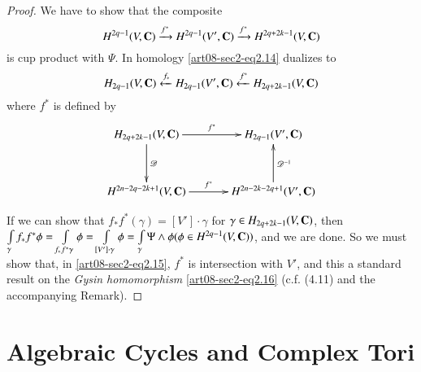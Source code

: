 \begin{proof}
We have to show that the composite
\begin{equation}
H^{2q-1}(V,\mathbf{C})\xrightarrow{f^{*}}H^{2q-1}(V',\mathbf{C})\xrightarrow{f^{*}}H^{2q+2k-1}(V,\mathbf{C})\label{art08-sec2-eq2.14}
\end{equation}
is cup product with $\Psi$. In homology \eqref{art08-sec2-eq2.14} dualizes to 
\begin{equation}
H_{2q-1}(V,\mathbf{C})\xleftarrow{f_{*}}H_{2q-1}(V',\mathbf{C})\xleftarrow{f^{*}}H_{2q+2k-1}(V,\mathbf{C})\label{art08-sec2-eq2.15}
\end{equation}
where $f^{*}$ is defined by
\begin{equation}
\vcenter{\xymatrix@=1.2cm{
H_{2q+2k-1}(V,\bfC)\ar[d]^-{\mathscr{D}}\ar[r]^-{f^{*}} & H_{2q-1}(V',\bfC)\\
H^{2n-2q-2k+1}(V,\bfC)\ar[r]^-{f^{*}} & H^{2n-2k-2q+1}(V',\bfC)\ar[u]_{\mathscr{D}^{-1}}
}}\label{art08-sec2-eq2.16}
\end{equation}

If we can show that $f_{*}f^{*}(\gamma)=[V']\cdot \gamma$ for $\gamma \in H_{2q+2k-1}(V,\mathbf{C})$, then $\int\limits_{\gamma}f_{*}f^{*}\phi=\int\limits_{f_{*}f^{*}\gamma}\phi=\int\limits_{[V']\cdot \gamma}\phi=\int\limits_{\gamma}\Psi \wedge \phi(\phi\in H^{2q-1}(V,\mathbf{C}))$, and we are done. So we must show that, in \eqref{art08-sec2-eq2.15}, $f^{*}$ is intersection with $V'$, and this a standard result on the {\em Gysin homomorphism} \eqref{art08-sec2-eq2.16} (c.f. (4.11) and the accompanying Remark).
\end{proof}

\section{Algebraic Cycles and Complex Tori}\label{art08-sec3}

